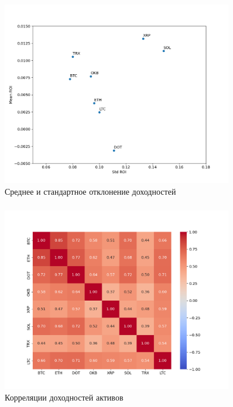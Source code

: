 \documentclass{beamer}
\begin{document}
\begin{frame}
    \frametitle{}
    \begin{figure}[H]
        \centering
        \includegraphics[width=0.9\textwidth]{rois_mean_std.png}
        \caption{Среднее и стандартное отклонение доходностей}
        \label{fig:rois_mean_std}
    \end{figure}
\end{frame}

\begin{frame}
    \frametitle{}
    \begin{figure}[H]
        \centering
        \includegraphics[width=0.9\textwidth]{corr.png}
        \caption{Корреляции доходностей активов}
        \label{fig:corr}
    \end{figure}
\end{frame}
\end{document}
